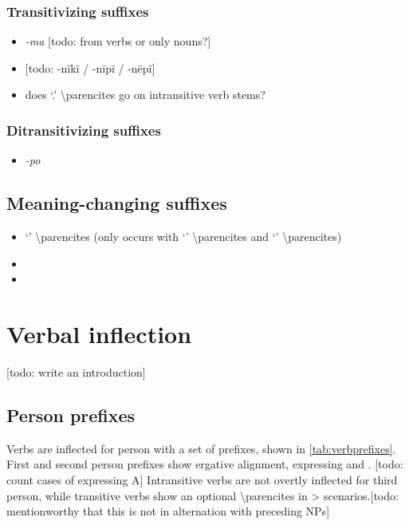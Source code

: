 \documentclass{memoir}
\begin{document}
\subsection{Transitivizing suffixes}

\begin{itemize}
\tightlist
\item
  \emph{-ma} {[}todo: from verbs or only nouns?{]}
\item
  {[}todo: -nïkï / -nïpï / -nëpï{]}
\item
  does  `.' \textbackslash parencites go on
  intransitive verb stems?
\end{itemize}

\subsection{Ditransitivizing suffixes}

\begin{itemize}
\tightlist
\item
  \emph{-po}
\end{itemize}

\section{Meaning-changing suffixes}

\begin{itemize}
\item
   `' \textbackslash parencites (only occurs with
   `' \textbackslash parencites and 
  `' \textbackslash parencites)
\item
\item
\end{itemize}

\chapter{\texorpdfstring{Verbal inflection
\label{verbinfl}}{Verbal inflection }}

{[}todo: write an introduction{]}

\section{\texorpdfstring{Person prefixes
\label{sec:verbperson}}{Person prefixes }}

Verbs are inflected for person with a set of prefixes, shown in
\cref{tab:verbprefixes}. First and second person prefixes show ergative
alignment, expressing  and . {[}todo: count cases of
expressing A{]} Intransitive verbs are not overtly inflected for third
person, while transitive verbs show an optional 
\textbackslash parencites in \textgreater{}
scenarios.{[}todo: mentionworthy that this is not in alternation with
preceding NPs{]}
\end{document}
